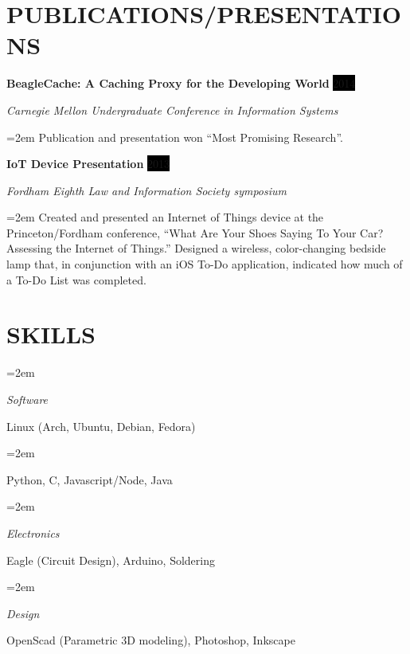 \documentclass[paper=a4,fontsize=11pt]{scrartcl} %
\newlength{\spacebox}
\newcommand{\sepspace}{\vspace*{1em}}		%
\newcommand{\NewPart}[1]{\section*{\uppercase{#1}}}
\newcommand{\PersonalEntry}[2]{
		\noindent\hangindent=2em\hangafter=0 %
		\parbox{\spacebox}{        %
		\textit{#1}}		       %
		\hspace{1.5em} #2 \par}    %
\newcommand{\SkillsEntry}[2]{      %
		\noindent\hangindent=2em\hangafter=0 %
		\parbox{\spacebox}{        %
		\textit{#1}}			   %
		\hspace{1.5em} #2 \par}    %
\newcommand{\EducationEntry}[4]{
		\noindent \textbf{#1} \hfill      %
		\colorbox{Black}{%
			\parbox{6em}{%
			\hfill\color{White}#2}} \par  %
		\noindent \textit{#3} \par        %
		\noindent\hangindent=2em\hangafter=0 \small #4 %
		\normalsize \par}
\newcommand{\WorkEntry}[4]{				  %
		\noindent \textbf{#1} \hfill      %
		\colorbox{Black}{\color{White}#2} \par  %
		\noindent \textit{#3} \par              %
		\noindent\hangindent=2em\hangafter=0 \small #4 %
		\normalsize \par}
\begin{document}
\NewPart{Publications/Presentations}{}

\WorkEntry{BeagleCache: A Caching Proxy for the Developing World}{2014}{Carnegie Mellon Undergraduate Conference in Information Systems}{
	Publication and presentation won ``Most Promising Research''.
}
\sepspace

\WorkEntry{IoT Device Presentation}{2013}{Fordham Eighth Law and Information Society symposium}{
	Created and presented an Internet of Things device at the Princeton/Fordham conference, ``What Are Your Shoes Saying To Your Car?  Assessing the Internet of Things.''  Designed a wireless, color-changing bedside lamp that, in conjunction with an iOS To-Do application, indicated how much of a To-Do List was completed.
}
\sepspace


\NewPart{Skills}
\SkillsEntry{Software}{Linux (Arch, Ubuntu, Debian, Fedora)}
\SkillsEntry{}{Python, C, Javascript/Node, Java}


\SkillsEntry{Electronics}{Eagle (Circuit Design), Arduino, Soldering}

\SkillsEntry{Design}{OpenScad (Parametric 3D modeling), Photoshop, Inkscape}
\end{document}
